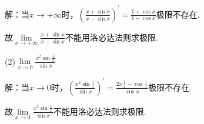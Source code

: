 \documentclass{article}
\begin{document}
\begin{enumerate}[1.]
				解：当$x\rightarrow +\infty$时，$(\frac{x+\sin x}{x-\sin x})^{'} =\frac{1+\cos x}{1-\cos x}$极限不存在.
				
				故$\lim\limits_{x\rightarrow +\infty}\frac{x+\sin x}{x-\sin x}$不能用洛必达法则求极限.
				
				(2)$\lim\limits _{x \rightarrow 0} \frac{x^{2} \sin \frac{1}{x}}{\sin x}$
				
				解：当$x\rightarrow 0$时，$(\frac{x^2\sin \frac{1}{x}}{\sin x})^{'}=\frac{2x\frac{1}{x}-\cos \frac{1}{x}}{\cos x}$极限不存在.
				
				故$\lim\limits _{x \rightarrow 0} \frac{x^{2} \sin \frac{1}{x}}{\sin x}$不能用洛必达法则求极限.
		\end{enumerate}
\end{document}
